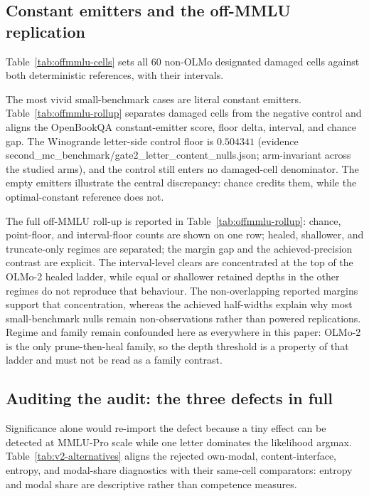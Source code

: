 \subsection{Constant emitters and the off-MMLU replication}
\label{app:offmmlu}

Table~\ref{tab:offmmlu-cells} sets all 60 non-OLMo designated damaged cells against both deterministic references, with their intervals.





The most vivid small-benchmark cases are literal constant emitters. Table~\ref{tab:offmmlu-rollup} separates damaged cells from the negative control and aligns the OpenBookQA constant-emitter score, floor delta, interval, and chance gap. The Winogrande letter-side control floor is $0.504341$ (evidence \textsf{second\_mc\_benchmark/gate2\_letter\_content\_nulls.json}; arm-invariant across the studied arms), and the control still enters no damaged-cell denominator. The empty emitters illustrate the central discrepancy: chance credits them, while the optimal-constant reference does not.

The full off-MMLU roll-up is reported in Table~\ref{tab:offmmlu-rollup}: chance, point-floor, and interval-floor counts are shown on one row; healed, shallower, and truncate-only regimes are separated; the margin gap and the achieved-precision contrast are explicit. The interval-level clears are concentrated at the top of the OLMo-2 healed ladder, while equal or shallower retained depths in the other regimes do not reproduce that behaviour. The non-overlapping reported margins support that concentration, whereas the achieved half-widths explain why most small-benchmark nulls remain non-observations rather than powered replications. Regime and family remain confounded here as everywhere in this paper: OLMo-2 is the only prune-then-heal family, so the depth threshold is a property of that ladder and must not be read as a family contrast.

\subsection{Auditing the audit: the three defects in full}
\label{app:audit}

Significance alone would re-import the defect because a tiny effect can be detected at MMLU-Pro scale while one letter dominates the likelihood argmax. Table~\ref{tab:v2-alternatives} aligns the rejected own-modal, content-interface, entropy, and modal-share diagnostics with their same-cell comparators: entropy and modal share are descriptive rather than competence measures.

